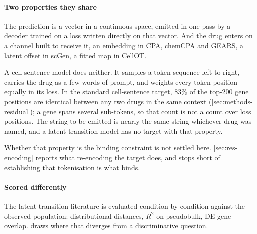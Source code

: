 \paragraph{Two properties they share} The prediction is a vector in a continuous
space, emitted in one pass by a decoder trained on a loss written directly on
that vector. And the drug enters on a channel built to receive it, an embedding
in CPA, chemCPA and GEARS, a latent offset in scGen, a fitted map in CellOT.

A cell-sentence model does neither. It samples a token sequence left to right,
carries the drug as a few words of prompt, and weights every token position
equally in its loss. In the standard cell-sentence target, $83\%$ of the
top-$200$ gene positions are identical between any two drugs in the same context
(\cref{sec:methods-residual}); a gene spans several sub-tokens, so that count is
not a count over loss positions. The string to be emitted is nearly the same string
whichever drug was named, and a latent-transition model has no target with that
property.

Whether that property is the binding constraint is not settled here.
\cref{sec:res-encoding} reports what re-encoding the target does, and stops
short of establishing that tokenisation is what binds.

\paragraph{Scored differently} The latent-transition literature is evaluated
condition by condition against the observed population: distributional distances,
$R^2$ on pseudobulk, DE-gene overlap.  draws where that
diverges from a discriminative question.

\begin{figure}[htbp]
\begin{lrbox}{\tvfb}%
%
\end{lrbox}

\end{figure}

